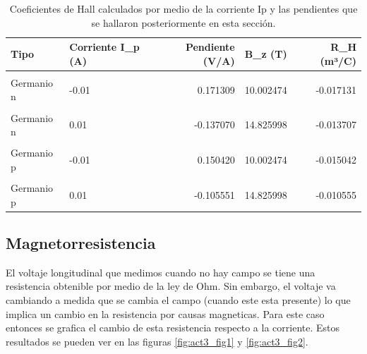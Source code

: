 \documentclass[a4paper, amsfonts, amssymb, amsmath, reprint, showkeys, nofootinbib, twoside]{revtex4-1}
\begin{document}
\begin{table}[!h]
\centering
  \caption{Coeficientes de Hall calculados por medio de la corriente Ip y las pendientes que se hallaron posteriormente en esta sección.}
\label{tab:act1_tab2}
\centering
\begin{tabular}[t]{l|l|r|r|r}
\hline
Tipo & Corriente I\_p (A) & Pendiente (V/A) & B\_z (T) & R\_H (m³/C)\\
\hline
\cellcolor{gray!10}{Germanio n} & \cellcolor{gray!10}{-0.025} & \cellcolor{gray!10}{0.387267} & \cellcolor{gray!10}{6.384831} & \cellcolor{gray!10}{-0.015491}\\
\hline
Germanio n & -0.01 & 0.171309 & 10.002474 & -0.017131\\
\hline
\cellcolor{gray!10}{Germanio n} & \cellcolor{gray!10}{0} & \cellcolor{gray!10}{-0.032249} & \cellcolor{gray!10}{12.414236} & \cellcolor{gray!10}{-Inf}\\
\hline
Germanio n & 0.01 & -0.137070 & 14.825998 & -0.013707\\
\hline
\cellcolor{gray!10}{Germanio p} & \cellcolor{gray!10}{-0.025} & \cellcolor{gray!10}{0.279648} & \cellcolor{gray!10}{6.384831} & \cellcolor{gray!10}{-0.011186}\\
\hline
Germanio p & -0.01 & 0.150420 & 10.002474 & -0.015042\\
\hline
\cellcolor{gray!10}{Germanio p} & \cellcolor{gray!10}{0} & \cellcolor{gray!10}{0.012553} & \cellcolor{gray!10}{12.414236} & \cellcolor{gray!10}{Inf}\\
\hline
Germanio p & 0.01 & -0.105551 & 14.825998 & -0.010555\\
\hline
\end{tabular}
\end{table}

\subsection{Magnetorresistencia}

El voltaje longitudinal que medimos cuando no hay campo se tiene una resistencia obtenible por medio de la ley de Ohm. Sin embargo, el voltaje va cambiando a medida que se cambia el campo (cuando este esta presente) lo que implica un cambio en la resistencia por causas magneticas. Para este caso entonces se grafica el cambio de esta resistencia respecto a la corriente. Estos resultados se pueden ver en las figuras \ref{fig:act3_fig1} y \ref{fig:act3_fig2}.
\end{document}
